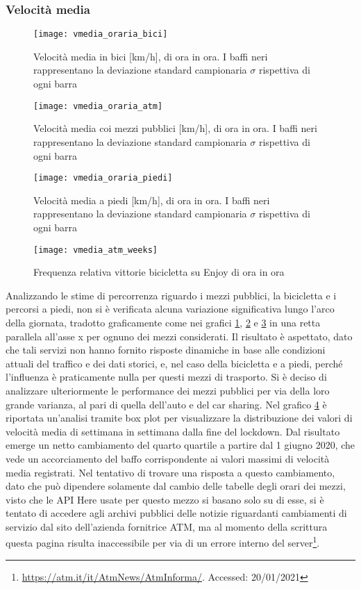 \subsubsection{Velocità media}

\begin{figure}[H]
	\texttt{[image: vmedia\_oraria\_bici]}
	\caption{Velocità media in bici [km/h], di ora in ora. I baffi neri rappresentano la deviazione standard campionaria $\sigma$ rispettiva di ogni barra}
	\label{image:11}
\end{figure}

\begin{figure}[H]
	\texttt{[image: vmedia\_oraria\_atm]}
	\caption{Velocità media coi mezzi pubblici [km/h], di ora in ora. I baffi neri rappresentano la deviazione standard campionaria $\sigma$ rispettiva di ogni barra}
	\label{image:17}
\end{figure}

\begin{figure}[H]
	\texttt{[image: vmedia\_oraria\_piedi]}
	\caption{Velocità media a piedi [km/h], di ora in ora. I baffi neri rappresentano la deviazione standard campionaria $\sigma$ rispettiva di ogni barra}
	\label{image:18}
\end{figure}

\begin{figure}[H]
	\texttt{[image: vmedia\_atm\_weeks]}
	\caption{Frequenza relativa vittorie bicicletta su Enjoy di ora in ora}
	\label{image:29}
\end{figure}

Analizzando le stime di percorrenza riguardo i mezzi pubblici, la bicicletta e i percorsi a piedi, non si è verificata alcuna variazione significativa lungo l'arco della giornata, tradotto graficamente come nei grafici \ref{image:11}, \ref{image:17} e \ref{image:18} in una retta parallela all'asse x per ognuno dei mezzi considerati. Il risultato è aspettato, dato che tali servizi non hanno fornito risposte dinamiche in base alle condizioni attuali del traffico e dei dati storici, e, nel caso della bicicletta e a piedi, perché l'influenza è praticamente nulla per questi mezzi di trasporto. Si è deciso di analizzare ulteriormente le performance dei mezzi pubblici per via della loro grande varianza, al pari di quella dell'auto e del car sharing. Nel grafico \ref{image:29} è riportata un'analisi tramite box plot per visualizzare la distribuzione dei valori di velocità media di settimana in settimana dalla fine del lockdown. Dal risultato emerge un netto cambiamento del quarto quartile a partire dal 1 giugno 2020, che vede un accorciamento del baffo corrispondente ai valori massimi di velocità media registrati. Nel tentativo di trovare una risposta a questo cambiamento, dato che può dipendere solamente dal cambio delle tabelle degli orari dei mezzi, visto che le API Here usate per questo mezzo si basano solo su di esse, si è tentato di accedere agli archivi pubblici delle notizie riguardanti cambiamenti di servizio dal sito dell'azienda fornitrice ATM, ma al momento della scrittura questa pagina risulta inaccessibile per via di un errore interno del server\footnote{\url{https://atm.it/it/AtmNews/AtmInforma/}. Accessed: 20/01/2021}.


